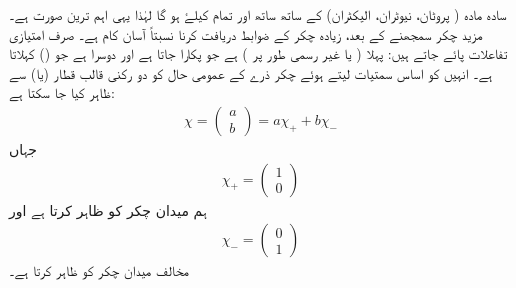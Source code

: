 سادہ مادہ ( پروٹان، نیوٹران، الیکٹران) کے ساتھ ساتھ  اور تمام  کیلۓ  ہو گا لہٰذا یہی اہم ترین صورت ہے۔ مزید چکر سمجھنے کے بعد، زیادہ چکر کے ضوابط دریافت کرنا نسبتاً آسان کام ہے۔ صرف  امتیازی تفاعلات پائے جاتے ہیں: پہلا  ( یا غیر رسمی طور پر ) ہے جو پکارا جاتا ہے اور دوسرا  ہے جو  () کہلاتا ہے۔ انہیں کو اساس سمتیات لیتے ہوئے  چکر ذرے کے عمومی حال کو دو رکنی قالب قطار (یا) سے ظاہر کیا جا سکتا ہے:
\begin{align}\label{مساوات_تین_بعدی_عمومی_حال_چائے}
 \chi=\begin{pmatrix} a \\ b \end{pmatrix}= a\chi_{+} + b\chi_{-} 
 \end{align}
جہاں
\begin{align} 
 \chi_{+}=\begin{pmatrix}1\\0 \end{pmatrix}
 \end{align}
ہم میدان چکر کو ظاہر کرتا ہے اور 
\begin{align} 
 \chi_{-}=\begin{pmatrix}0 \\1 \end{pmatrix}
 \end{align}
مخالف میدان چکر کو ظاہر کرتا ہے۔

